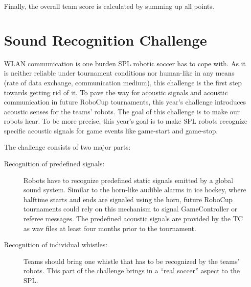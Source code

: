 \documentclass[12pt]{article}
\begin{document}
Finally, the overall team score is calculated by summing up all points.


\newpage





\section{Sound Recognition Challenge}

WLAN communication is one burden SPL robotic soccer has to cope with. As it is neither reliable under tournament conditions nor human-like in any means (rate of data exchange, communication medium), this challenge is the first step towards getting rid of it. To pave the way for acoustic signals and acoustic communication in future RoboCup tournaments, this year's challenge introduces acoustic senses for the teams' robots. The goal of this challenge is to make our robots hear. To be more precise, this year's goal is to make SPL robots recognize specific acoustic signals for game events like game-start and game-stop.

The challenge consists of two major parts:
\begin{description}
	\item[Recognition of predefined signals:] Robots have to recognize predefined static signals emitted by a global sound system. Similar to the horn-like audible alarms in ice hockey, where halftime starts and ends are signaled using the horn, future RoboCup tournaments could rely on this mechanism to signal GameController or referee messages. The predefined acoustic signals are provided by the TC as wav files at least four months prior to the tournament.
	
	\item[Recognition of individual whistles:] Teams should bring one whistle that has to be recognized by the teams' robots. This part of the challenge brings in a ``real soccer'' aspect to the SPL.
	
\end{description}
\end{document}
